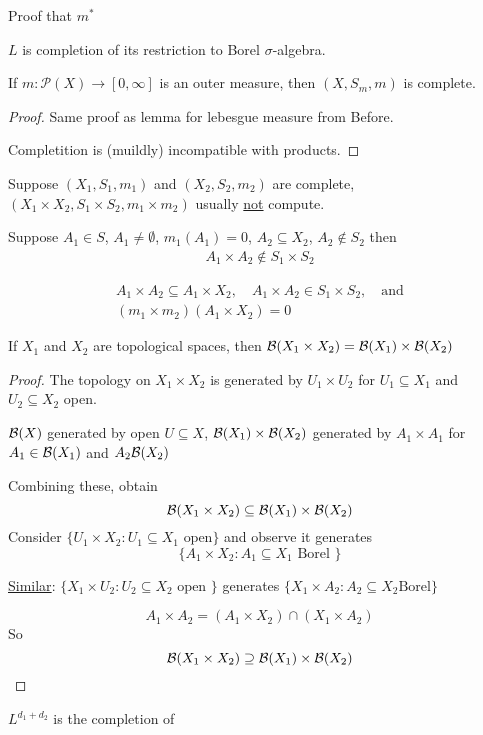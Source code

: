 Proof that $m^*$ 

\begin{corollary}
	$L$ is completion of its restriction to Borel $\sigma$-algebra.
\end{corollary}

\begin{theorem}
	If $m : \mathcal{P}(X) \to [0,\infty]$ is an outer measure, then $(X,S_m, m)$ is complete.
\end{theorem}

\begin{proof}
	Same proof as lemma for lebesgue measure from Before.

	Completition is (muildly) incompatible with products.
\end{proof}

\begin{example}
	Suppose $(X_1, S_1, m_1)$ and  $(X_2, S_2, m_2)$ are complete, 
	$(X_1 \times X_2, S_1 \times S_2, m_1 \times m_2)$ usually \underline{not} compute.
\end{example}

Suppose $A_1 \in S$, $A_1 \neq \emptyset$,  $m_1(A_1) = 0$,  $A_2 \subseteq X_2$, $A_2 \notin S_2$
then
\begin{align*}
	A_1 \times A_2 \notin S_1 \times S_2
\end{align*}

\begin{align*}
	A_1 \times A_2 \subseteq A_1 \times X_2, \quad A_1 \times A_2 \in S_1 \times S_2, \quad \text{and} \\
	(m_1 \times m_2) (A_1 \times X_2) = 0
\end{align*}

\begin{lemma}
	If $X_1$ and $X_2$ are topological spaces, then $\mathcal{B}(X_1 \times X_2) = \mathcal{B}(X_1) \times \mathcal{B}(X_2)$
\end{lemma}

\begin{proof}
	The topology on $X_1 \times X_2$ is generated by $U_1 \times U_2$ for $U_1 \subseteq X_1$ and $U_2 \subseteq X_2$ open.

	$\mathcal{B}(X)$ generated by open $U \subseteq X$, $\mathcal{B}(X_1) \times \mathcal{B}(X_2)$ generated by $A_1 \times A_1$ for 
	$A_1 \in \mathcal{B}(X_1)$ and $A_2 \mathcal{B}(X_2)$

	Combining these, obtain
	 \[
		\mathcal{B}(X_1 \times X_2) \subseteq \mathcal{B}(X_1) \times \mathcal{B}(X_2)
	\] 
	Consider $\{U_1 \times X_2 : U_1 \subseteq X_1 \text{ open} \}$
	and observe it generates 
	\[
		\{A_1 \times X_2 : A_1 \subseteq X_1 \text{ Borel } \}
	\] 

	\underline{Similar}: $\{ X_1 \times U_2 : U_2 \subseteq X_2 \text{ open }\}$ 
	generates $\{ X_1 \times A_2 : A_2 \subseteq X_2 \text{Borel} \}$

	\[
		A_1 \times A_2 = (A_1 \times X_2 ) \cap (X_1 \times A_2)
	\] So
	\[
		\mathcal{B}(X_1 \times X_2 ) \supseteq \mathcal{B}(X_1) \times \mathcal{B}(X_2)
	\] 
\end{proof}

\begin{corollary}
	$L^{d_1 + d_2}$ is the completion of 
	
\end{corollary}


